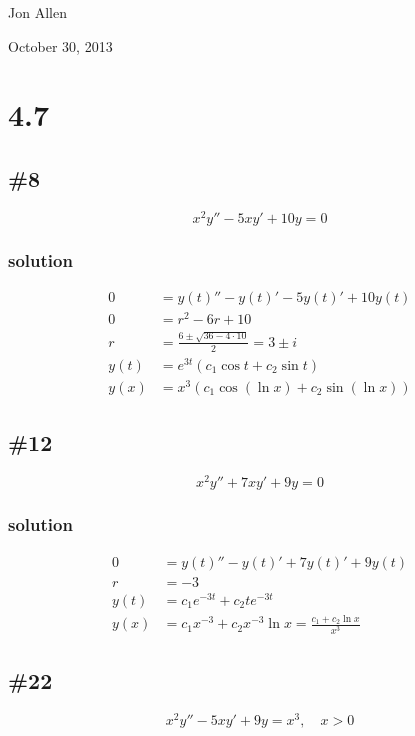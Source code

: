 \documentclass{article}
\begin{document}
Jon Allen

October 30, 2013

\section*{4.7}

\subsection*{\#8}
\[x^2y''-5xy'+10y=0\]
\subsubsection*{solution}
\begin{align*}
	0&=y(t)''-y(t)'-5y(t)'+10y(t)\\
	0&=r^2-6r+10\\
	r&=\frac{6\pm\sqrt{36-4\cdot10}}{2}=3\pm i\\
	y(t)&=e^{3t}\left(c_1\cos t+c_2\sin t\right)\\
	y(x)&=x^3\left(c_1\cos(\ln x)+c_2\sin(\ln x)\right)
\end{align*}

\subsection*{\#12}
\[x^2y''+7xy'+9y=0\]
\subsubsection*{solution}
\begin{align*}
	0&=y(t)''-y(t)'+7y(t)'+9y(t)\\
	r&=-3\\
	y(t)&=c_1e^{-3t}+c_2te^{-3t}\\
	y(x)&=c_1x^{-3}+c_2x^{-3}\ln x=\frac{c_1+c_2\ln x}{x^3}
\end{align*}

\subsection*{\#22}
\[x^2y''-5xy'+9y=x^3,\quad x>0\]
\end{document}
